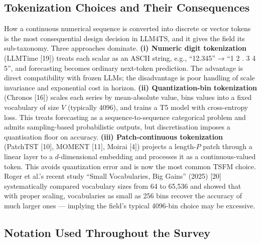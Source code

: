 \subsection{Tokenization Choices and Their Consequences}\label{tokenization-choices-and-their-consequences}

How a continuous numerical sequence is converted into discrete or vector tokens is the most consequential design decision in LLM4TS, and it gives the field its sub-taxonomy. Three approaches dominate. \textbf{(i) Numeric digit tokenization} (LLMTime {[}19{]}) treats each scalar as an ASCII string, e.g., ``12.345'' → ``1 2 . 3 4 5'', and forecasting becomes ordinary next-token prediction. The advantage is direct compatibility with frozen LLMs; the disadvantage is poor handling of scale invariance and exponential cost in horizon. \textbf{(ii) Quantization-bin tokenization} (Chronos {[}16{]}) scales each series by mean-absolute value, bins values into a fixed vocabulary of size \(V\) (typically 4096), and trains a T5 model with cross-entropy loss. This treats forecasting as a sequence-to-sequence categorical problem and admits sampling-based probabilistic outputs, but discretisation imposes a quantisation floor on accuracy. \textbf{(iii) Patch-continuous tokenization} (PatchTST {[}10{]}, MOMENT {[}11{]}, Moirai {[}4{]}) projects a length-\(P\) patch through a linear layer to a \(d\)-dimensional embedding and processes it as a continuous-valued token. This avoids quantization error and is now the most common TSFM choice. Roger et al.'s recent study ``Small Vocabularies, Big Gains'' (2025) {[}20{]} systematically compared vocabulary sizes from 64 to 65,536 and showed that with proper scaling, vocabularies as small as 256 bins recover the accuracy of much larger ones --- implying the field's typical 4096-bin choice may be excessive.

\subsection{Notation Used Throughout the Survey}\label{notation-used-throughout-the-survey}

